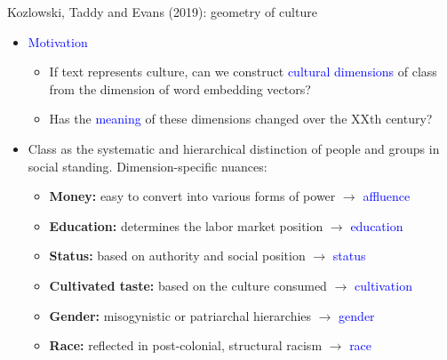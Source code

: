 \documentclass[usenames,dvipsnames,english]{beamer}
\begin{document}
\begin{frame}{Kozlowski, Taddy and Evans (2019): geometry of culture}

    \begin{itemize}
    \setlength{\itemsep}{0.8em}
        \item \textcolor{blue}{Motivation}
        \begin{itemize}
        \setlength{\itemsep}{0.8em}
            \item If text represents culture, can we construct \textcolor{blue}{cultural dimensions} of class from the dimension of word embedding vectors?
            \item Has the \textcolor{blue}{meaning} of these dimensions changed over the XXth century?
        \end{itemize}
        \item Class as the systematic and hierarchical distinction of people and groups in social standing. Dimension-specific nuances:
        \begin{itemize}
        \setlength{\itemsep}{0.8em}
\vspace{5pt}
            \item \textbf{Money:} easy to convert into various forms of power $\rightarrow$ \textcolor{blue}{affluence} 
            \item \textbf{Education:} determines the labor market position $\rightarrow$ \textcolor{blue}{education} 
            \item \textbf{Status:} based on authority and social position $\rightarrow$ \textcolor{blue}{status} 
            \item \textbf{Cultivated taste:} based on the culture consumed $\rightarrow$ \textcolor{blue}{cultivation} 
            \item \textbf{Gender:} misogynistic or patriarchal hierarchies $\rightarrow$ \textcolor{blue}{gender} 
            \item \textbf{Race:} reflected in post-colonial, structural racism $\rightarrow$ \textcolor{blue}{race} 
        \end{itemize}
        
    \end{itemize}
    
\end{frame}
\end{document}
